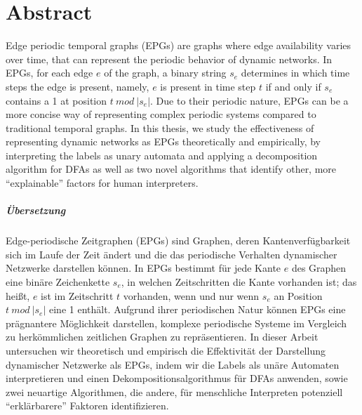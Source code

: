 \chapter*{Abstract}
Edge periodic temporal graphs (EPGs) are graphs where edge availability varies over time, that can represent the periodic behavior of dynamic networks.
In EPGs, for each edge $e$ of the graph, a binary string $s_e$ determines in which time steps the edge is present, namely, $e$ is present in time step $t$ if and only if $s_e$ contains a 1 at position $t~ mod~ |s_e|$.
Due to their periodic nature, EPGs can be a more concise way of representing complex periodic systems compared to traditional temporal graphs.
In this thesis, we study the effectiveness of representing dynamic networks as EPGs theoretically and empirically, by interpreting the labels as unary automata and applying a decomposition algorithm for DFAs as well as two novel algorithms that identify other, more \enquote{explainable} factors for human interpreters.

\paragraph{Übersetzung}
Edge-periodische Zeitgraphen (EPGs)  sind Graphen, deren Kantenverfügbarkeit sich im Laufe der Zeit ändert und die das periodische Verhalten dynamischer Netzwerke darstellen können.
In EPGs bestimmt für jede Kante $e$ des Graphen eine binäre Zeichenkette $s_e$, in welchen Zeitschritten die Kante vorhanden ist; das heißt, $e$ ist im Zeitschritt $t$ vorhanden, wenn und nur wenn $s_e$ an Position $t~ mod~ |s_e|$ eine 1 enthält.
Aufgrund ihrer periodischen Natur können EPGs eine prägnantere Möglichkeit darstellen, komplexe periodische Systeme im Vergleich zu herkömmlichen zeitlichen Graphen zu repräsentieren. In dieser Arbeit untersuchen wir theoretisch und empirisch die Effektivität der Darstellung dynamischer Netzwerke als EPGs, indem wir die Labels als unäre Automaten interpretieren und einen Dekompositionsalgorithmus für DFAs anwenden, sowie zwei neuartige Algorithmen, die andere, für menschliche Interpreten potenziell \enquote{erklärbarere} Faktoren identifizieren.